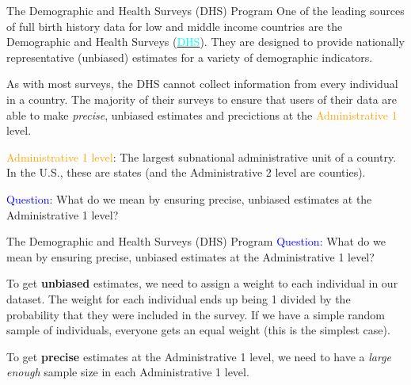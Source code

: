 \documentclass[10pt,t]{beamer}
\begin{document}
\begin{frame}{The Demographic and Health Surveys (DHS) Program}
One of the leading sources of full birth history data for low and middle income countries are the Demographic and Health Surveys (\href{https://dhsprogram.com/}{\textcolor{cyan}{DHS}}). They are designed to provide nationally representative (unbiased) estimates for a variety of demographic indicators. 

\vspace{0.3cm}

As with most surveys, the DHS cannot collect information from every individual in a country. The majority of their surveys to ensure that users of their data are able to make \textit{precise}, unbiased estimates and precictions at the \textcolor{orange}{Administrative 1} level.

\vspace{0.3cm}

\textcolor{orange}{Administrative 1 level}: The largest subnational administrative unit of a country. In the U.S., these are states (and the Administrative 2 level are counties).

\vspace{0.3cm}

\textcolor{blue}{Question:} What do we mean by ensuring precise, unbiased estimates at the Administrative 1 level?

\end{frame}

\begin{frame}{The Demographic and Health Surveys (DHS) Program}
\textcolor{blue}{Question:} What do we mean by ensuring precise, unbiased estimates at the Administrative 1 level?

\vspace{0.3cm}

To get \textbf{unbiased} estimates, we need to assign a weight to each individual in our dataset. The weight for each individual ends up being 1 divided by the probability that they were included in the survey. If we have a simple random sample of individuals, everyone gets an equal weight (this is the simplest case).

\vspace{0.3cm}

To get \textbf{precise} estimates at the Administrative 1 level, we need to have a \textit{large enough} sample size in each Administrative 1 level.

\end{frame}
\end{document}
